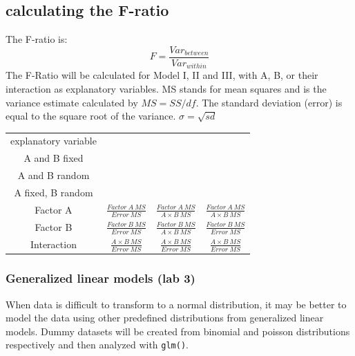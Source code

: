 \documentclass{article}
\begin{document}
\subsection{calculating the F-ratio}
The F-ratio is: $$F = \frac{Var_{between}}{Var_{within}}$$
The F-Ratio will be calculated for Model I, II and III, with A, B, or their interaction as explanatory variables. MS stands for mean squares and is the variance estimate calculated by $MS = SS/df$.
The standard deviation (error) is equal to the square root of the variance. $\sigma = \sqrt{sd}$
\begin{table}[h]
    \centering
    \begin{tabular}{c|c|c|c}
         explanatory variable & \thead{\textbf{Model I:} \\A and B fixed} & \thead{\textbf{Model II:}\\ A and B random} & \thead{\textbf{Model III:}\\ A fixed, B random} \\
         \hline
         Factor A & $\frac{Factor \: A \: MS}{Error \: MS}$ & $\frac{Factor \: A \: MS}{A \times B \: MS}$ & $\frac{Factor \: A \: MS}{A \times B \: MS}$ \\
         \hline
         Factor B & $\frac{Factor \: B \: MS}{Error \: MS}$ & $\frac{Factor \: B \: MS}{A \times B \: MS}$ & $\frac{Factor \: B \: MS}{Error \: MS}$ \\
         \hline
         Interaction & $\frac{A \times B \: MS}{Error \: MS}$ & $\frac{A \times B \: MS}{Error \: MS}$ & $\frac{A \times B \: MS}{Error \: MS}$ \\
    \end{tabular}
\end{table}
\renewcommand{\arraystretch}{1}

\subsubsection{Generalized linear models (lab 3)}
When data is difficult to transform to a normal distribution, it may be better to model the data using other predefined distributions from generalized linear models. Dummy datasets will be created from binomial and poisson distributions respectively and then analyzed with \texttt{glm()}.
\end{document}
